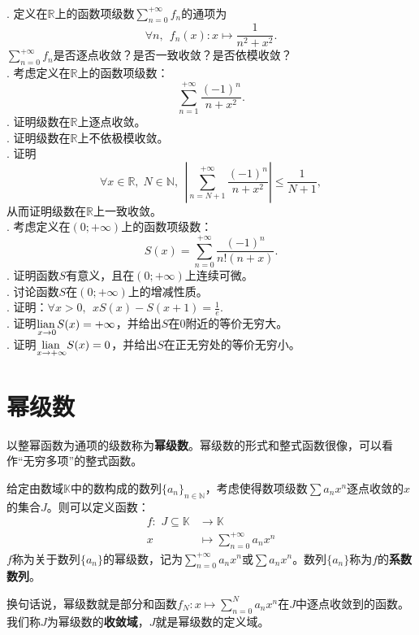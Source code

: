 \documentclass[12pt,UTF8]{ctexbook}
\begin{document}
\begin{appendix}
\begin{so}
\end{so}

\begin{xt}
    \mbox{} \\
    . 定义在$\mathbb{R}$上的函数项级数$\sum_{n=0}^{+\infty} f_n$的通项为
    $$ \forall n, \;\, f_n(x): x \mapsto \frac{1}{n^2 + x^2}.$$
    \indent $\sum_{n=0}^{+\infty} f_n$是否逐点收敛？是否一致收敛？是否依模收敛？\\ 
    . 考虑定义在$\mathbb{R}$上的函数项级数：
    $$\sum_{n=1}^{+\infty} \frac{(-1)^n}{n + x^2}.$$
    . 证明级数在$\mathbb{R}$上逐点收敛。\\
    . 证明级数在$\mathbb{R}$上不依极模收敛。\\
    . 证明
    $$\forall x\in\mathbb{R},\; N\in\mathbb{N},\;\,\left|\sum_{n=N+1}^{+\infty} \frac{(-1)^n}{n + x^2}\right| \leqslant \frac{1}{N+1},$$
    \indent 从而证明级数在$\mathbb{R}$上一致收敛。\\
    . 考虑定义在$(0;+\infty)$上的函数项级数：
    $$S(x) = \sum_{n=0}^{+\infty} \frac{(-1)^n}{n!(n + x)}.$$
    . 证明函数$S$有意义，且在$(0;+\infty)$上连续可微。\\
    . 讨论函数$S$在$(0;+\infty)$上的增减性质。\\
    . 证明：$\forall x > 0,\;\, xS(x) - S(x + 1) = \frac{1}{e}.$ \\
    . 证明$\underset{x\to 0}{\operatorname{lian}\,} S(x) = +\infty$，并给出$S$在$0$附近的等价无穷大。\\
    . 证明$\underset{x\to +\infty}{\operatorname{lian}\,} S(x) = 0$，并给出$S$在正无穷处的等价无穷小。\\
\end{xt}

\chapter{幂级数}

以整幂函数为通项的级数称为\textbf{幂级数}。幂级数的形式和整式函数很像，可以看作“无穷多项”的整式函数。
\begin{df}
    给定由数域$\mathbb{K}$中的数构成的数列$\{a_n\}_{n\in\mathbb{N}}$，考虑使得数项级数$\sum a_n x^n$逐点收敛的$x$的集合$J$。则可以定义函数：
    $$
    \begin{array}{rl}
        f: \,\, J\subseteq \mathbb{K} &\rightarrow \mathbb{K} \\
        x &\displaystyle \mapsto \sum_{n=0}^{+\infty} a_n x^n        
    \end{array}
    $$
    $f$称为关于数列$\{a_n\}$的幂级数，记为$\sum_{n=0}^{+\infty} a_n x^n$或$\sum a_n x^n$。数列$\{a_n\}$称为$f$的\textbf{系数数列}。
\end{df}
换句话说，幂级数就是部分和函数$f_N : x\mapsto \sum_{n=0}^{N} a_n x^n$在$J$中逐点收敛到的函数。
我们称$J$为幂级数的\textbf{收敛域}，$J$就是幂级数的定义域。


\end{appendix}
\end{document}
